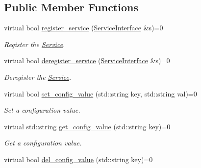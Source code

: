 \subsection*{Public Member Functions}
\begin{DoxyCompactItemize}
\item 
\hypertarget{classConsulInterface_ad1d3a241b2fc31e4b13789a49a0d010a}{virtual bool \hyperlink{classConsulInterface_ad1d3a241b2fc31e4b13789a49a0d010a}{register\-\_\-service} (\hyperlink{classServiceInterface}{Service\-Interface} \&s)=0}\label{classConsulInterface_ad1d3a241b2fc31e4b13789a49a0d010a}

\begin{DoxyCompactList}\small\item\em Register the \hyperlink{classService}{Service}. \end{DoxyCompactList}\item 
\hypertarget{classConsulInterface_ac97f7a426f3de5023edc637ab984b4c4}{virtual bool \hyperlink{classConsulInterface_ac97f7a426f3de5023edc637ab984b4c4}{deregister\-\_\-service} (\hyperlink{classServiceInterface}{Service\-Interface} \&s)=0}\label{classConsulInterface_ac97f7a426f3de5023edc637ab984b4c4}

\begin{DoxyCompactList}\small\item\em Deregister the \hyperlink{classService}{Service}. \end{DoxyCompactList}\item 
virtual bool \hyperlink{classConsulInterface_a98ce2623db59b3f8804691a4039957a8}{set\-\_\-config\-\_\-value} (std\-::string key, std\-::string val)=0
\begin{DoxyCompactList}\small\item\em Set a configuration value. \end{DoxyCompactList}\item 
\hypertarget{classConsulInterface_a1cc4bdfe75f86f69626e109847aba6af}{virtual std\-::string \hyperlink{classConsulInterface_a1cc4bdfe75f86f69626e109847aba6af}{get\-\_\-config\-\_\-value} (std\-::string key)=0}\label{classConsulInterface_a1cc4bdfe75f86f69626e109847aba6af}

\begin{DoxyCompactList}\small\item\em Get a configuration value. \end{DoxyCompactList}\item 
\hypertarget{classConsulInterface_a3a6e57ac45cf284e92def6136b0e23d9}{virtual bool \hyperlink{classConsulInterface_a3a6e57ac45cf284e92def6136b0e23d9}{del\-\_\-config\-\_\-value} (std\-::string key)=0}\label{classConsulInterface_a3a6e57ac45cf284e92def6136b0e23d9}


\end{DoxyCompactItemize}
